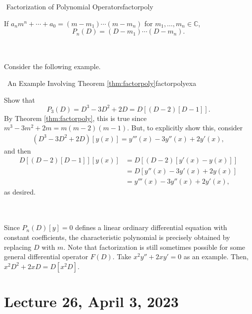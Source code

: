         \begin{theorem}{\Stop\,\,Factorization of Polynomial Operators}{factorpoly}

            If \(a_nm^n+\cdots+a_0=(m-m_1)\cdots(m-m_n)\) for \(m_1,\ldots,m_n\in\mathbb{C}\), 
            \begin{equation*}
                P_n(D)=(D-m_1)\cdots(D-m_n).
            \end{equation*}
            
        \end{theorem}
        \pagebreak
        \vphantom
        \\
        \\
        Consider the following example.
        \begin{example}{\Difficulty\,\Difficulty\,\,An Example Involving Theorem \ref{thm:factorpoly}}{factorpolyexa}

            Show that
            \begin{equation*}
                P_3(D)=D^3-3D^2+2D=D[(D-2)[D-1]].
            \end{equation*}
            By Theorem \ref{thm:factorpoly}, this is true since \(m^3-3m^2+2m=m(m-2)(m-1)\). But, to explicitly show this, consider
            \begin{align*}
                (D^3-3D^2+2D)[y(x)]=y'''(x)-3y''(x)+2y'(x),
            \end{align*}
            and then
            \begin{align*}
                D[(D-2)[D-1]][y(x)]&=D[(D-2)[y'(x)-y(x)]] \\
                &=D[y''(x)-3y'(x)+2y(x)] \\
                &=y'''(x)-3y''(x)+2y'(x),
            \end{align*}
            as desired.
            
        \end{example}
        \vphantom
        \\
        \\
        Since \(P_n(D)[y]=0\) defines a linear ordinary differential equation with constant coefficients, the characteristic polynomial is precisely obtained by replacing \(D\) with \(m\). Note that factorization is still sometimes possible for some general differential operator \(F(D)\). Take \(x^2y''+2xy'=0\) as an example. Then, \(x^2D^2+2xD=D[x^2D]\).

\pagebreak

\section{Lecture 26, April 3, 2023}

